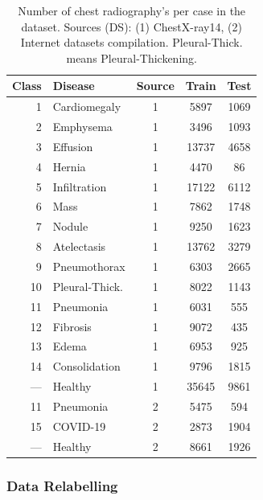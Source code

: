 {\begin{table}[!ht]
    \centering
    \begin{tabular}{| r |l | c | c | c |}
     \hline
     Class & Disease & Source & Train & Test  \\
     \hline\hline
     1  & Cardiomegaly       & 1 & 5897  & 1069 \\
     2  & Emphysema          & 1 & 3496  & 1093 \\
     3  & Effusion           & 1 & 13737 & 4658 \\
     4  & Hernia             & 1 & 4470  & 86   \\
     5  & Infiltration       & 1 & 17122 & 6112 \\
     6  & Mass               & 1 & 7862  & 1748 \\
     7  & Nodule             & 1 & 9250  & 1623 \\
     8  & Atelectasis        & 1 & 13762 & 3279 \\
     9  & Pneumothorax       & 1 & 6303  & 2665 \\
     10 & Pleural-Thick.     & 1 & 8022  & 1143 \\
     11 & Pneumonia          & 1 & 6031  & 555  \\
     12 & Fibrosis           & 1 & 9072  & 435  \\
     13 & Edema              & 1 & 6953  & 925  \\
     14 & Consolidation      & 1 & 9796  & 1815 \\
     ---&  Healthy           & 1 & 35645 & 9861 \\
     \hline
     11 & Pneumonia          & 2 & 5475  & 594  \\
     15 & COVID-19           & 2 & 2873  & 1904 \\
     ---&  Healthy           & 2 & 8661  & 1926 \\
     \hline
    \end{tabular}
    \caption{Number of chest radiography's per case in the dataset. Sources (DS): (1) ChestX-ray14,
             (2) Internet datasets compilation. Pleural-Thick. means Pleural-Thickening.}
    \label{table_dataset}
\end{table}

\subsubsection{Data Relabelling}
\label{ssec_relabelling}

}
